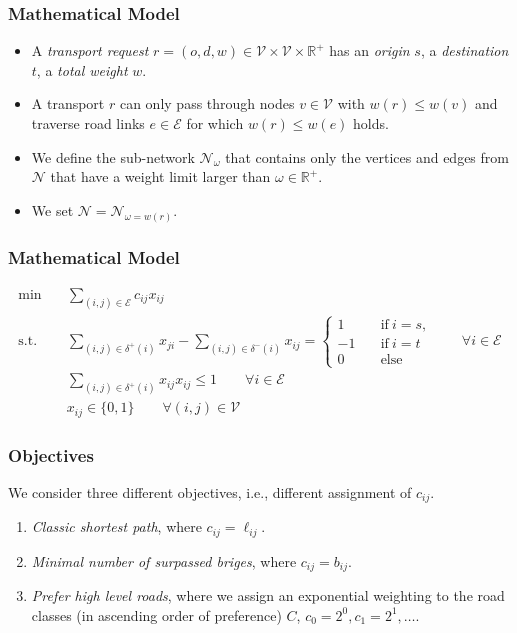 \documentclass{beamer}   %
\newcommand{\RNum}[1]{\uppercase\expandafter{\romannumeral #1\relax}}
\theoremstyle{break}
\begin{document}
  \begin{frame}
    \frametitle{Mathematical Model \RNum{2}}

    \begin{itemize}
      \item
      A \emph{transport request} $r=(o,d,w) \in \mathcal{V} \times \mathcal{V} \times \mathbb{R}^{+}$
      has an \emph{origin} $s$, a \emph{destination} $t$, a \emph{total weight} $w$.

      \item A transport $r$ can only pass through nodes $v \in \mathcal{V}$ with
      $w(r) \leq w(v)$ and traverse road links $e \in \mathcal{E}$ for which $w(r) \leq w(e)$ holds.

      \item We define the sub-network $\mathcal{N}_{\omega}$ that contains only the vertices and edges from $\mathcal{N}$ that have a weight limit larger than $\omega \in \mathbb{R}^{+}$.

      \item We set $\mathcal{N}=\mathcal{N}_{\omega=w(r)}$.
    \end{itemize}

  \end{frame}



  \begin{frame}
    \frametitle{Mathematical Model \RNum{3}}
    \begin{align}
      \min \quad &\sum_{(i,j)\in \mathcal{E}}  c_{ij} x_{ij} \label{obj} \\
      \text{s.t.}\quad &
      \sum_{(i,j)\in \delta^{+} (i)} x_{ji} - \sum_{(i,j)\in \delta^{-}(i)} x_{ij} =
      \begin{cases}
        1 \quad& \text{if}~ i=s, \\
        -1 \quad& \text{if}~ i=t \\
        0 \quad&\text{else}
      \end{cases}
      \qquad \forall i \in \mathcal{E}
      \\
      &  \sum_{(i,j)\in \delta^{+} (i)} x_{ij}   x_ {ij} \leq 1     \qquad \forall i \in \mathcal{E}\\
      &  x_{ij} \in \{0,1\}   \qquad \forall (i,j) \in \mathcal{V}
    \end{align}
  \end{frame}


  \begin{frame}
    \frametitle{Objectives}
    We consider three different objectives, i.e., different assignment of $c_{ij}$.
    \begin{enumerate}
      \item \emph{Classic shortest path}, where $c_{ij}=\ell_{ij}$. \label{obj_short}
      \item \emph{Minimal number of surpassed briges}, where  $c_{ij}=b_{ij}$.  \label{obj_minBridge}
      \item \emph{Prefer high level roads}, where we assign an exponential weighting to the road classes (in ascending order of preference) $C$, $c_0=2^0,c_1=2^1, \ldots$.  \label{obj_highLevelRoad}
    \end{enumerate}
  \end{frame}
 
\end{document}

